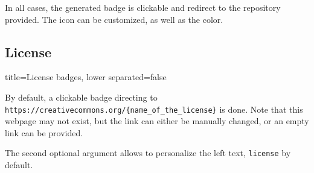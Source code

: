 In all cases, the generated badge is clickable and redirect to the repository provided.
The icon can be customized, as well as the color.

\subsection{License}

\begin{tcblisting}{title={License badges}, lower separated=false}
\end{tcblisting}

By default, a clickable badge directing to \texttt{https://creativecommons.org/\{name\_of\_the\_license\}} is done.
Note that this webpage may not exist, but the link can either be manually changed, or an empty link can be provided.

The second optional argument allows to personalize the left text, \texttt{license} by default.

